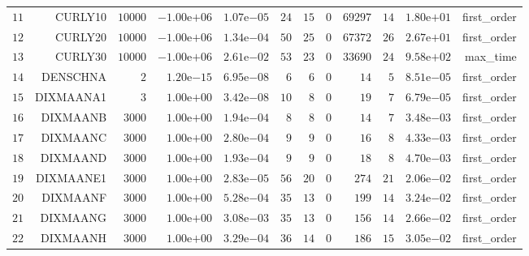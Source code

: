 \begin{longtable}{rrrrrrrrrrrr}
  \(    11\) & CURLY10 & \( 10000\) & \(-1.00\)e\(+06\) & \( 1.07\)e\(-05\) & \(    24\) & \(    15\) & \(     0\) & \( 69297\) & \(    14\) & \( 1.80\)e\(+01\) & first\_order \\
  \(    12\) & CURLY20 & \( 10000\) & \(-1.00\)e\(+06\) & \( 1.34\)e\(-04\) & \(    50\) & \(    25\) & \(     0\) & \( 67372\) & \(    26\) & \( 2.67\)e\(+01\) & first\_order \\
  \(    13\) & CURLY30 & \( 10000\) & \(-1.00\)e\(+06\) & \( 2.61\)e\(-02\) & \(    53\) & \(    23\) & \(     0\) & \( 33690\) & \(    24\) & \( 9.58\)e\(+02\) & max\_time \\
  \(    14\) & DENSCHNA & \(     2\) & \( 1.20\)e\(-15\) & \( 6.95\)e\(-08\) & \(     6\) & \(     6\) & \(     0\) & \(    14\) & \(     5\) & \( 8.51\)e\(-05\) & first\_order \\
  \(    15\) & DIXMAANA1 & \(     3\) & \( 1.00\)e\(+00\) & \( 3.42\)e\(-08\) & \(    10\) & \(     8\) & \(     0\) & \(    19\) & \(     7\) & \( 6.79\)e\(-05\) & first\_order \\
  \(    16\) & DIXMAANB & \(  3000\) & \( 1.00\)e\(+00\) & \( 1.94\)e\(-04\) & \(     8\) & \(     8\) & \(     0\) & \(    14\) & \(     7\) & \( 3.48\)e\(-03\) & first\_order \\
  \(    17\) & DIXMAANC & \(  3000\) & \( 1.00\)e\(+00\) & \( 2.80\)e\(-04\) & \(     9\) & \(     9\) & \(     0\) & \(    16\) & \(     8\) & \( 4.33\)e\(-03\) & first\_order \\
  \(    18\) & DIXMAAND & \(  3000\) & \( 1.00\)e\(+00\) & \( 1.93\)e\(-04\) & \(     9\) & \(     9\) & \(     0\) & \(    18\) & \(     8\) & \( 4.70\)e\(-03\) & first\_order \\
  \(    19\) & DIXMAANE1 & \(  3000\) & \( 1.00\)e\(+00\) & \( 2.83\)e\(-05\) & \(    56\) & \(    20\) & \(     0\) & \(   274\) & \(    21\) & \( 2.06\)e\(-02\) & first\_order \\
  \(    20\) & DIXMAANF & \(  3000\) & \( 1.00\)e\(+00\) & \( 5.28\)e\(-04\) & \(    35\) & \(    13\) & \(     0\) & \(   199\) & \(    14\) & \( 3.24\)e\(-02\) & first\_order \\
  \(    21\) & DIXMAANG & \(  3000\) & \( 1.00\)e\(+00\) & \( 3.08\)e\(-03\) & \(    35\) & \(    13\) & \(     0\) & \(   156\) & \(    14\) & \( 2.66\)e\(-02\) & first\_order \\
  \(    22\) & DIXMAANH & \(  3000\) & \( 1.00\)e\(+00\) & \( 3.29\)e\(-04\) & \(    36\) & \(    14\) & \(     0\) & \(   186\) & \(    15\) & \( 3.05\)e\(-02\) & first\_order \\

\end{longtable}
